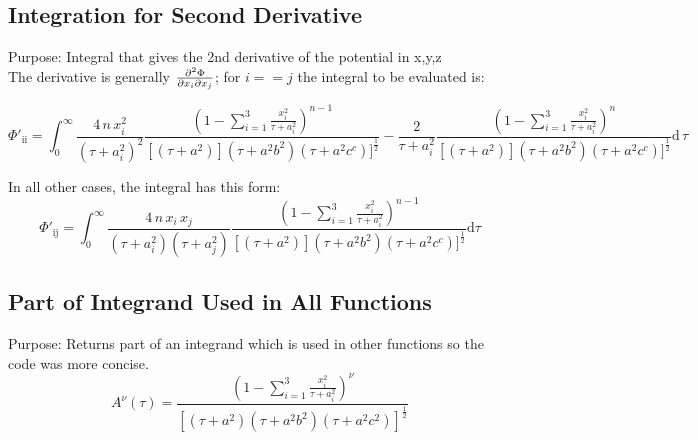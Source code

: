 \documentclass[a4paper,11pt]{article}
\begin{document}
			
	
		
		\subsection{Integration for Second Derivative}
			Purpose: Integral that gives the 2nd derivative of the potential in x,y,z \\
			
			\noindent The derivative is generally $ \pdv{\Phi}{x_i}{x_j} $; for $ i==j $ the integral to be evaluated is: 
			
		\begin{equation}
		\Phi'_{\mathrm{ii}} = \int_{0}^{\infty} 
		 \frac{4\,n\,x_i^2}{(\tau + a_i^2)^2} \frac{\left(1- \sum_{i=1}^{3} \frac{x_i^2}{\tau + a_i^2}\right)^{n-1}}{[(\tau + a^2)](\tau + a^2b^2)(\tau + a^2c^c)]^\frac{1}{2}}
		- \frac{2}{\tau + a_i^2} \frac{\left(1- \sum_{i=1}^{3} \frac{x_i^2}{\tau + a_i^2}\right)^{n}}{[(\tau + a^2)](\tau + a^2b^2)(\tau + a^2c^c)]^\frac{1}{2}} \mathrm{d}\,\tau
		\end{equation}
		
			\noindent In all other cases, the integral has this form:
		\begin{equation}
		\Phi'_{\mathrm{ij}} = \int_{0}^{\infty} 
		\frac{4\,n\,x_i\,x_j}{(\tau + a_i^2)(\tau + a_j^2)} \frac{\left(1- \sum_{i=1}^{3} \frac{x_i^2}{\tau + a_i^2}\right)^{n-1}}{[(\tau + a^2)](\tau + a^2b^2)(\tau + a^2c^c)]^\frac{1}{2}} \mathrm{d}\tau
		\end{equation}	
			
			
		
	
		\subsection{Part of Integrand Used in All Functions}
			Purpose: Returns part of an integrand which is used in other functions so the code was more concise. \\
		\begin{equation}
		A^{\nu}(\tau) = \frac{\left(1- \sum_{i=1}^{3} \frac{x_i^2}{\tau + a_i^2}\right)^{\nu}}{[(\tau + a^2)(\tau + a^2b^2)(\tau + a^2c^2)]^\frac{1}{2}}
		\end{equation}
			
	
	
	
\end{document}
